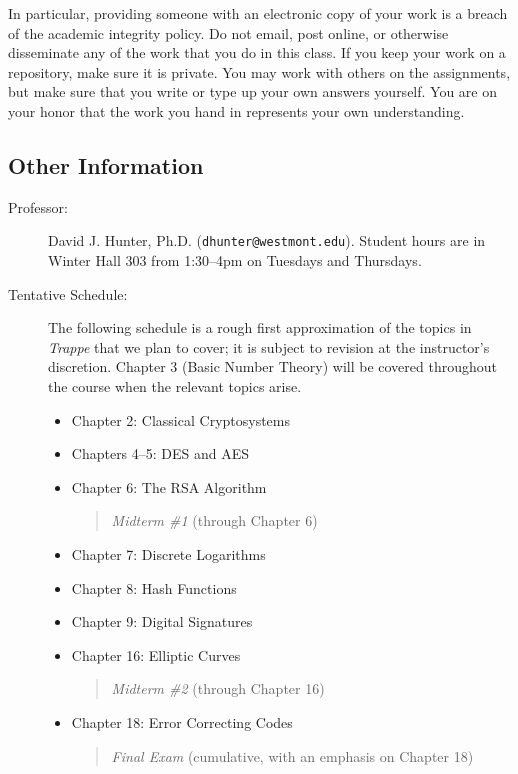 \documentclass[
  twoside]{article}
\begin{document}
In particular, providing someone with an electronic copy of your work is
a breach of the academic integrity policy. Do not email, post online, or
otherwise disseminate any of the work that you do in this class. If you
keep your work on a repository, make sure it is private. You may work
with others on the assignments, but make sure that you write or type up
your own answers yourself. You are on your honor that the work you hand
in represents your own understanding.

\hypertarget{other-information}{%
\subsection{Other Information}\label{other-information}}

\begin{description} 

\item[Professor:] David J. Hunter, Ph.D.
  (\verb!dhunter@westmont.edu!). Student hours are in Winter Hall 303 
  from 1:30--4pm on Tuesdays and Thursdays.

 \item[Tentative Schedule:] The following schedule is a rough first approximation of the topics in \textit{Trappe} that we plan to cover; it is subject to revision at the instructor's discretion. Chapter 3 (Basic Number Theory) will be covered throughout the course when the relevant topics arise.
  \begin{itemize}
      \item Chapter 2: Classical Cryptosystems
      \item Chapters 4--5: DES and AES
      \item Chapter 6: The RSA Algorithm
   \begin{quote}
    \textit{Midterm \#1}     (through Chapter 6)
   \end{quote}
      \item Chapter 7: Discrete Logarithms
      \item Chapter 8: Hash Functions
      \item Chapter 9: Digital Signatures
      \item Chapter 16: Elliptic Curves
   \begin{quote}
    \textit{Midterm \#2}     (through Chapter 16)
   \end{quote}
      \item Chapter 18: Error Correcting Codes
   \begin{quote}
    \textit{Final Exam}     (cumulative, with an emphasis on Chapter 18)
   \end{quote}
  \end{itemize}


\end{description}
\end{document}
